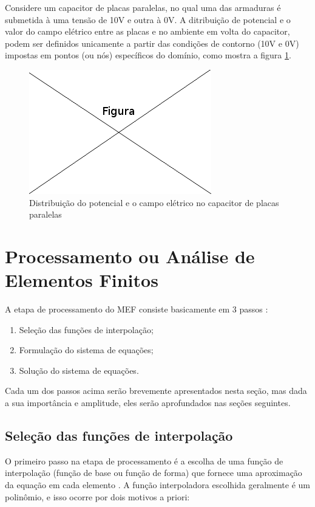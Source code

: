 Considere um capacitor de placas paralelas, no qual uma das armaduras é submetida à uma tensão de 10V e outra à 0V. A ditribuição de potencial e o valor do campo elétrico entre as placas e no ambiente em volta do capacitor, podem ser definidos unicamente a partir das condições de contorno (10V e 0V) impostas em pontos (ou nós) específicos do domínio, como mostra a figura \ref{fig:capacitor}.

\begin{figure}[!htb]
\centering
\includegraphics[scale=0.5]{figuras/temp.png}
\caption{Distribuição do potencial e o campo elétrico no capacitor de placas paralelas}
\label{fig:capacitor}
\end{figure}


\section{Processamento ou Análise de Elementos Finitos}
A etapa de processamento do MEF consiste basicamente em 3 passos \citep[p. 31]{jin}:

\begin{enumerate}  
\item Seleção das funções de interpolação;
\item Formulação do sistema de equações;
\item Solução do sistema de equações. 
\end{enumerate}

Cada um dos passos acima serão brevemente apresentados nesta seção, mas dada a sua importância e amplitude, eles serão aprofundados nas seções seguintes.

\subsection{Seleção das funções de interpolação}
O primeiro passo na etapa de processamento é a escolha de uma função de interpolação (função de base ou função de forma) \citep[p. 37]{volakis} que fornece uma aproximação da equação em cada elemento \citep[p. 32]{jin}. 
A função interpoladora escolhida geralmente é um polinômio, e isso ocorre por dois motivos a priori: \citep[p. 77]{desai}

